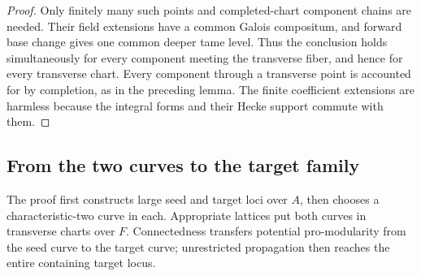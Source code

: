 \begin{proof}
Only finitely many such points and completed-chart
component chains are needed. Their field extensions
have a common Galois compositum, and forward base change gives
one common deeper tame level. Thus the conclusion
holds simultaneously for every component meeting the
transverse fiber, and hence for every transverse chart.
Every component through a transverse point is accounted
for by completion, as in the preceding lemma. The
finite coefficient extensions are harmless because the
integral forms and their Hecke support commute with them.
\end{proof}

\subsection{From the two curves to the target family}

The proof first constructs large seed and target loci over \(A\),
then chooses a characteristic-two curve in each. Appropriate lattices
put both curves in transverse charts over \(F\). Connectedness transfers
potential pro-modularity from the seed curve to the target curve;
unrestricted propagation then reaches the entire containing target locus.

